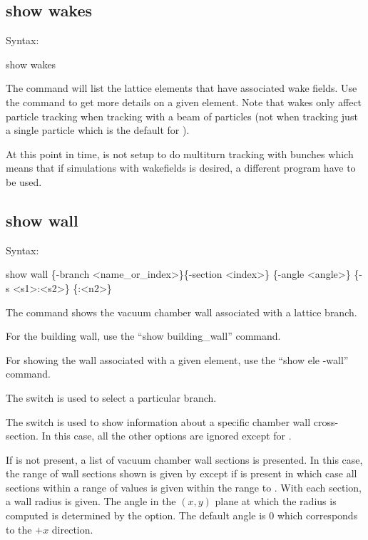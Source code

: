 {{{{{{{{{\subsection{show wakes}
\label{s:show.wakes}

Syntax:
\begin{example}
  show wakes 
\end{example}

The  command will list the lattice elements that have associated wake
fields.  Use the  command to get more details on a given element. Note that
wakes only affect particle tracking when tracking with a beam of particles (not when
tracking just a single particle which is the default for \tao). 

At this point in time, \tao is not setup to do multiturn tracking with bunches which means
that if simulations with wakefields is desired, a different program have to be used.


\subsection{show wall}
\label{s:show.wall}

Syntax:
\begin{example}
  show wall \{-branch <name_or_index>\}\{-section <index>\} \{-angle <angle>\}
  \{-s <s1>:<s2>\} \{<n1>:<n2>\}
\end{example}

The  command shows the vacuum chamber wall associated with a lattice branch.

For the building wall, use the ``show building_wall'' command.

For showing the wall associated with a given element, use the ``show ele -wall'' command.

The  switch is used to select a particular branch.

The  switch is used to show information about a specific chamber wall
cross-section. In this case, all the other options are ignored except for .

If  is not present, a list of vacuum chamber wall sections is presented. In
this case, the range of wall sections shown is given by  except if 
is present in which case all sections within a range of  values is given within the
range  to . With each section, a wall radius is given. The angle in the
$(x,y)$ plane at which the radius is computed is determined by the  option. The
default angle is 0 which corresponds to the $+x$ direction.

}}}}}}}}}
